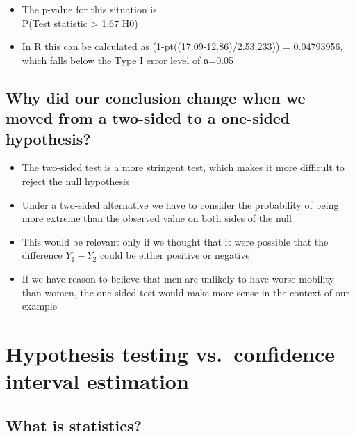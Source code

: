 \documentclass[
]{book}
\providecommand{\tightlist}{%
  \setlength{\itemsep}{0pt}\setlength{\parskip}{0pt}}
\begin{document}
\begin{itemize}
\tightlist
\item
  The p-value for this situation is\\
  P(Test statistic \textgreater{} 1.67\textbar{} H0)
\item
  In R this can be calculated as (1-pt((17.09-12.86)/2.53,233)) = 0.04793956,
  which falls below the Type I error level of α=0.05
\end{itemize}

\hypertarget{why-did-our-conclusion-change-when-we-moved-from-a-two-sided-to-a-one-sided-hypothesis}{%
\subsection{Why did our conclusion change when we moved from a two-sided to a one-sided hypothesis?}\label{why-did-our-conclusion-change-when-we-moved-from-a-two-sided-to-a-one-sided-hypothesis}}

\begin{itemize}
\tightlist
\item
  The two-sided test is a more stringent test, which makes it more difficult to reject the null hypothesis
\item
  Under a two-sided alternative we have to consider the probability of being more extreme than the observed value on both sides of the null
\item
  This would be relevant only if we thought that it were possible that the difference \(\bar Y_1-\bar Y_2\) could be either positive or negative
\item
  If we have reason to believe that men are unlikely to have worse mobility than women, the one-sided test would make more sense in the context of our example
\end{itemize}

\hypertarget{hypothesis-testing-vs.-confidence-interval-estimation}{%
\section{Hypothesis testing vs.~confidence interval estimation}\label{hypothesis-testing-vs.-confidence-interval-estimation}}

\hypertarget{what-is-statistics-1}{%
\subsection{What is statistics?}\label{what-is-statistics-1}}
\end{document}
